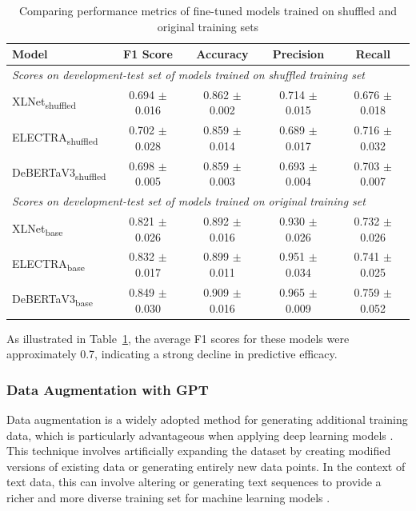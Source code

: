 \begin{table}[h]
    \centering
    \begin{tabular}{l|c|c|c|c}
    \hline
         \textbf{Model} & F1 Score & Accuracy & Precision & Recall \\
    \hline
    \hline
        \multicolumn{5}{l}{\textit{Scores on development-test set of models trained on shuffled training set}}\\
        XLNet\textsubscript{shuffled} & 0.694 $\pm$ 0.016 & 0.862 $\pm$ 0.002 & 0.714 $\pm$ 0.015 & 0.676 $\pm$ 0.018\\
        ELECTRA\textsubscript{shuffled} & 0.702 $\pm$ 0.028 & 0.859 $\pm$ 0.014 & 0.689 $\pm$ 0.017 & 0.716 $\pm$ 0.032\\
        DeBERTaV3\textsubscript{shuffled} & 0.698 $\pm$ 0.005 & 0.859 $\pm$ 0.003 & 0.693 $\pm$ 0.004 & 0.703 $\pm$ 0.007\\
    \hline
        \multicolumn{5}{l}{\textit{Scores on development-test set of models trained on original training set}}\\
         XLNet\textsubscript{base} & 0.821 $\pm$ 0.026 & 0.892 $\pm$ 0.016 & 0.930 $\pm$ 0.026 & 0.732 $\pm$ 0.026\\
         ELECTRA\textsubscript{base} & 0.832 $\pm$ 0.017 & 0.899 $\pm$ 0.011 & 0.951 $\pm$ 0.034 & 0.741 $\pm$ 0.025\\
         DeBERTaV3\textsubscript{base} & 0.849 $\pm$ 0.030 & 0.909 $\pm$ 0.016 & 0.965 $\pm$ 0.009 & 0.759 $\pm$ 0.052\\
    \hline
    \end{tabular}
    \caption{Comparing performance metrics of fine-tuned models trained on shuffled and original training sets}
    \label{tab:shuffle_scores}
\end{table}


As illustrated in Table~\ref{tab:shuffle_scores}, the average F1 scores for these models were approximately 0.7, indicating a strong decline in predictive efficacy.

\subsubsection{Data Augmentation with GPT}

Data augmentation is a widely adopted method for generating additional training data, which is particularly advantageous when applying deep learning models \cite{data_aug_shorten2021text}. This technique involves artificially expanding the dataset by creating modified versions of existing data or generating entirely new data points. In the context of text data, this can involve altering or generating text sequences to provide a richer and more diverse training set for machine learning models \cite{data_aug_abulaish2019text}.

